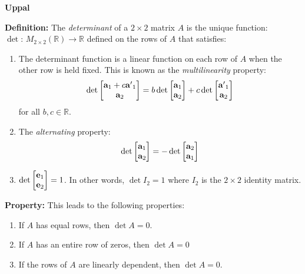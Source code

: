 \documentclass{article}
\begin{document}
    \begin{minipage}[t]{.45\linewidth}
        \begin{center}
            \textbf{Uppal}
        \end{center}
        \textbf{Definition:} The \textit{determinant} of a $2\times 2$ matrix $A$ is the unique function: $\det:\, M_{2\times 2}(\mathbb{R}) \to \mathbb{R}$ defined on the rows of $A$ that satisfies:
        \vspace{1mm}
        \begin{enumerate}[label=(\alph*)]
            \item The determinant function is a linear function on each row of $A$ when the other row is held fixed. This is known as the \textit{multilinearity} property:
            $$\det\begin{bmatrix}
                \mathbf{a}_1+c\mathbf{a'}_1 \\ \mathbf{a}_2
            \end{bmatrix} = b \det\begin{bmatrix}
                \mathbf{a}_1 \\ \mathbf{a}_2
            \end{bmatrix} + c \det\begin{bmatrix}
                \mathbf{a'}_1 \\ \mathbf{a}_2
            \end{bmatrix} $$
            for all $b,c \in \mathbb{R}$.
            \item The \textit{alternating} property: $$\det \begin{bmatrix}
                \mathbf{a}_1 \\ \mathbf{a}_2
            \end{bmatrix} = - \det\begin{bmatrix}
                \mathbf{a}_2 \\ \mathbf{a}_1
            \end{bmatrix}$$
            \item $\det \begin{bmatrix}
                \mathbf{e}_1 \\ \mathbf{e}_2
            \end{bmatrix} = 1$. In other words, $\det I_2=1$ where $I_2$ is the $2\times 2 $ identity matrix.
        \end{enumerate}
        \vspace{2mm}
        
        \textbf{Property:} This leads to the following properties:
        \begin{enumerate}[label=(\alph*)]
            \item If $A$ has equal rows, then $\det A = 0$.
            \item If $A$ has an entire row of zeros, then $\det A = 0$
            \item If the rows of $A$ are linearly dependent, then $\det A = 0$.
        \end{enumerate}
        \vspace{2mm}


\end{minipage}
\end{document}
